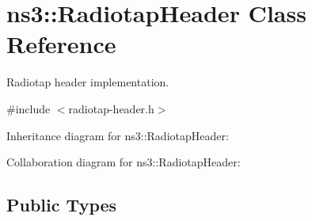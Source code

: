 \hypertarget{classns3_1_1RadiotapHeader}{}\section{ns3\+:\+:Radiotap\+Header Class Reference}
\label{classns3_1_1RadiotapHeader}


Radiotap header implementation.  




{\ttfamily \#include $<$radiotap-\/header.\+h$>$}



Inheritance diagram for ns3\+:\+:Radiotap\+Header\+:


Collaboration diagram for ns3\+:\+:Radiotap\+Header\+:
\subsection*{Public Types}
